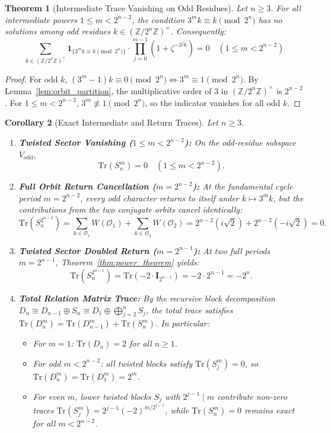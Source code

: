 \documentclass[11pt,reqno]{article}
\theoremstyle{plain}
\newtheorem{theorem}{Theorem}[section]
\newtheorem{corollary}[theorem]{Corollary}
\theoremstyle{definition}
\theoremstyle{remark}
\newcommand{\Z}{\mathbb{Z}}
\newcommand{\Tr}{\mathrm{Tr}}
\begin{document}
\begin{theorem}[Intermediate Trace Vanishing on Odd Residues]
\label{thm:trace_vanishing}
Let $n \ge 3$. For all intermediate powers $1 \le m < 2^{n-2}$, the condition $3^m k \equiv k \pmod{2^n}$ has no solutions among odd residues $k \in (\Z/2^n\Z)^\times$. Consequently:
\[
\sum_{k \in (\Z/2^n\Z)^\times} \mathbf{1}_{\{3^m k \equiv k \pmod{2^n}\}} \cdot \prod_{j=0}^{m-1} \left( 1 + \zeta^{-3^j k} \right) = 0 \quad (1 \le m < 2^{n-2})
\]
\end{theorem}

\begin{proof}
For odd $k$, $(3^m - 1)k \equiv 0 \pmod{2^n} \iff 3^m \equiv 1 \pmod{2^n}$. By Lemma~\ref{lem:orbit_partition}, the multiplicative order of $3$ in $(\Z/2^n\Z)^\times$ is $2^{n-2}$. For $1 \le m < 2^{n-2}$, $3^m \not\equiv 1 \pmod{2^n}$, so the indicator vanishes for all odd $k$.
\end{proof}

\begin{corollary}[Exact Intermediate and Return Traces]
\label{cor:trace_evaluations}
Let $n \ge 3$.
\begin{enumerate}
    \item \textbf{Twisted Sector Vanishing ($1 \le m < 2^{n-2}$):} On the odd-residue subspace $V_{\mathrm{odd}}$,
    \[
    \Tr(S_n^m) = 0 \quad (1 \le m < 2^{n-2}).
    \]
    \item \textbf{Full Orbit Return Cancellation ($m = 2^{n-2}$):} At the fundamental cycle period $m = 2^{n-2}$, every odd character returns to itself under $k \mapsto 3^m k$, but the contributions from the two conjugate orbits cancel identically:
    \[
    \Tr(S_n^{2^{n-2}}) = \sum_{k \in \mathcal{O}_1} W(\mathcal{O}_1) + \sum_{k \in \mathcal{O}_2} W(\mathcal{O}_2) = 2^{n-2} (i\sqrt{2}) + 2^{n-2} (-i\sqrt{2}) = 0.
    \]
    \item \textbf{Twisted Sector Doubled Return ($m = 2^{n-1}$):} At two full periods $m = 2^{n-1}$, Theorem~\ref{thm:power_theorem} yields:
    \[
    \Tr(S_n^{2^{n-1}}) = \Tr(-2 \cdot \mathbf{I}_{2^{n-1}}) = -2 \cdot 2^{n-1} = -2^n.
    \]
    \item \textbf{Total Relation Matrix Trace:} By the recursive block decomposition $D_n \cong D_{n-1} \oplus S_n \cong D_1 \oplus \bigoplus_{j=2}^n S_j$, the total trace satisfies $\Tr(D_n^m) = \Tr(D_{n-1}^m) + \Tr(S_n^m)$. In particular:
    \begin{itemize}
        \item For $m = 1$: $\Tr(D_n) = 2$ for all $n \ge 1$.
        \item For odd $m < 2^{n-2}$: all twisted blocks satisfy $\Tr(S_j^m) = 0$, so $\Tr(D_n^m) = \Tr(D_1^m) = 2^m$.
        \item For even $m$, lower twisted blocks $S_j$ with $2^{j-1} \mid m$ contribute non-zero traces $\Tr(S_j^m) = 2^{j-1} (-2)^{m / 2^{j-1}}$, while $\Tr(S_n^m) = 0$ remains exact for all $m < 2^{n-2}$.
    \end{itemize}
\end{enumerate}
\end{corollary}
\end{document}
